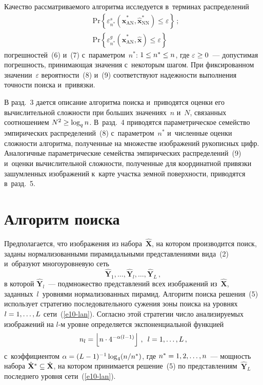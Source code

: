 \begin{multicols}{2}
  Качество рассматриваемого алгоритма исследуется в~терминах 
распределений 
  \begin{align}
  &\mathrm{Pr} \left\{ \varepsilon^s_{n^*}\left( 
\hat{\mathbf{x}}^*_{\mathrm{AN}}, \hat{\mathbf{x}}^*_{\mathrm{NN}}\right) \leq 
\varepsilon\right\}\,;\label{e8-lan}\\
  &\mathrm{Pr} \left\{ \varepsilon^g_{n^*}\left( 
\hat{\mathbf{x}}^*_{\mathrm{AN}}, \hat{\mathbf{x}}\right) \leq 
\varepsilon\right\}\label{e9-lan}
  \end{align}
погрешностей~(6) и~(7) с~параметром~$n^*$: $1\hm\leq n^*\hm\leq n$, где 
$\varepsilon\hm\geq 0$~--- допустимая погрешность, при\-ни\-ма\-ющая значения 
с~некоторым шагом. При фиксированном значении~$\varepsilon$ вероятности~(8) 
и~(9) соответствуют надежности выполнения точности поиска и~привязки. 
  
  В разд.~3 дается описание алгоритма поиска и~приводятся оценки его 
вычислительной сложности при больших значениях~$n$ и~$N$, связанных 
соотношением $N^2\hm\geq \log_q n$. В~разд.~4 приводятся параметрическое 
семейство эмпирических распределений~(8) с~параметром~$n^*$ 
и~численные оценки сложности алгоритма, 
полученные на множестве изображений рукописных цифр. Аналогичные 
параметрические семейства эмпирических распределений~(9) и~оценки 
вычислительной сложности, полученные для координатной привязки 
зашумленных изображений к~карте участка земной поверхности, приводятся 
в~разд.~5. 
  
  \section{Алгоритм поиска}
  
  Предполагается, что изображения из набора~$\hat{\mathbf{X}}$, на котором 
производится поиск, заданы нормализованными пирамидальными 
представлениями вида~(2) и~образуют многоуровневую сеть
  \begin{equation}
  \hat{\mathbf{Y}}_1,\ldots , \hat{\mathbf{Y}}_l,\ldots , \hat{\mathbf{Y}}_L\,,
  \label{e10-lan}
  \end{equation}
в которой $\hat{\mathbf{Y}}_l$~--- подмножество представлений всех 
изображений из~$\hat{\mathbf{X}}$, заданных~$l$~уровнями нормализованных 
пирамид. Алгоритм поиска решения~(5) использует стратегию 
последовательного сужения зоны поиска на уровнях $l\hm=1,\ldots , L$ 
сети~(\ref{e10-lan}). Согласно этой стратегии число анализируемых 
изоб\-ра\-же\-ний на $l$-м уровне определяется экспоненциальной функцией 
\begin{equation}
n_l=\left\lfloor n\cdot 4^{-\alpha(l-1)}\right\rfloor\,,\enskip l=1,\ldots , L\,,
\label{e11-lan}
\end{equation}
с~коэффициентом $\alpha\hm= (L\hm-1)^{-1}\log_4(n/n^*)$, где 
$n^*\hm=1,2,\ldots , n$~--- мощность набора $\hat{\mathbf{X}}^*\hm\subseteq 
\hat{\mathbf{X}}$, на котором принимается решение~(5) по 
представлениям~$\hat{\mathbf{Y}}_L$ последнего уровня сети~(\ref{e10-lan}).


\end{multicols}
